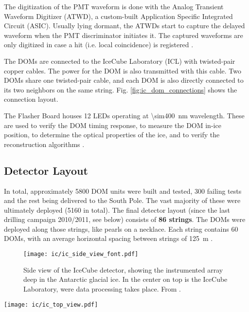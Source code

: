 The digitization of the PMT waveform is done with the Analog Transient Waveform Digitizer (ATWD), a custom-built Application Specific Integrated Circuit (ASIC). Usually lying dormant, the ATWDs start to capture the delayed waveform when the PMT discriminator initiates it. The captured waveforms are only digitized in case a hit (i.e. local coincidence) is registered \cite{Aartsen2017}.

The DOMs are connected to the IceCube Laboratory (ICL) with twisted-pair copper cables. The power for the DOM is also transmitted with this cable. Two DOMs share one twisted-pair cable, and each DOM is also directly connected to its two neighbors on the same string. Fig. \ref{fig:ic_dom_connections} shows the connection layout.

The Flasher Board houses 12 LEDs operating at \SI{\sim400}{\nm} wavelength. These are used to verify the DOM timing response, to measure the DOM in-ice position, to determine the optical properties of the ice, and to verify the reconstruction algorithms \cite{Aartsen2017}.

\subsection{Detector Layout}
In total, approximately 5800 DOM units were built and tested, 300 failing tests and the rest being delivered to the South Pole. The vast majority of these were ultimately deployed (5160 in total). The final detector layout (since the last drilling campaign 2010/2011, see below) consists of \textbf{86 strings}. The DOMs were deployed along those strings, like pearls on a necklace. Each string contains 60 DOMs, with an average horizontal spacing between strings of \SI{125}{\meter} \cite{Aartsen2017}.

\begin{figure}
    \texttt{[image: ic/ic\_side\_view\_font.pdf]}
    \caption[IceCube side-on]{Side view of the IceCube detector, showing the instrumented array deep in the Antarctic glacial ice. In the center on top is the IceCube Laboratory, were data processing takes place. From \cite{Ahlers2018a}.}
\end{figure}
\begin{marginfigure}
    \texttt{[image: ic/ic\_top\_view.pdf]}
    \caption[IceCube top-down view]{Top-down view of the IceCube detector, spanning \SI{1}{\square\km} on the surface. From \cite{Ahlers2018a}.}
\end{marginfigure}

